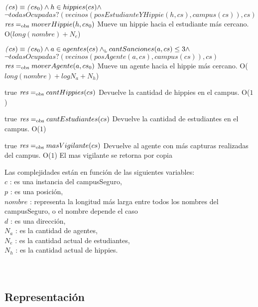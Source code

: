 {$\text{\textit{(}}cs) \equiv \text{\textit{(}}cs_0) \land h \in hippies(cs) \land $\\$ \neg todasOcupadas?(vecinos(posEstudianteYHippie(h, cs), campus(cs)), cs)$}
{$\text{\textit{res}} =_{\mathrm{obs}} moverHippie(h, cs_0)$}
{Mueve un hippie hacia el estudiante más cercano.}
{O($long(nombre) + N_e$)}
{}


{$\text{\textit{(}}cs) \equiv \text{\textit{(}}cs_0) \land a \in agentes(cs) \land_{\mathrm{\scriptscriptstyle{L}}} cantSanciones(a, cs) \leq 3 \land $\\$ \neg todasOcupadas?(vecinos(posAgente(a, cs), campus(cs)), cs)$}
{$\text{\textit{res}} =_{\mathrm{obs}} moverAgente(a, cs_0)$}
{Mueve un agente hacia el hippie más cercano.}
{O($long(nombre) + log N_a + N_h$)}
{}

 {true}
 {$\text{\textit{res}} =_{\mathrm{obs}} cantHippies(cs)$}
 {Devuelve la cantidad de hippies en el campus.}
 {O($1$)}
 {}
 
 {true}
 {$\text{\textit{res}} =_{\mathrm{obs}} cantEstudiantes(cs)$}
 {Devuelve la cantidad de estudiantes en el campus.}
 {O($1$)}
 {}
 
 {true}
 {$\text{\textit{res}} =_{\mathrm{obs}} masVigilante(cs)$}
 {Devuelve al agente con más capturas realizadas del campus.}
 {O($1$)}
 {El mas vigilante se retorna por copia}

Las complejidades están en función de las siguientes variables:\\
$c$ : es una instancia del campusSeguro, \\
$p$ : es una posición, \\
$nombre$ : representa la longitud más larga entre todos los nombres del campusSeguro, o el nombre depende el caso\\
$d$ : es una dirección, \\
$N_a$ : es la cantidad de agentes, \\
$N_e$ : es la cantidad actual de estudiantes, \\
$N_h$ : es la cantidad actual de hippies. \\
\\ \\


\subsection{Representación}

